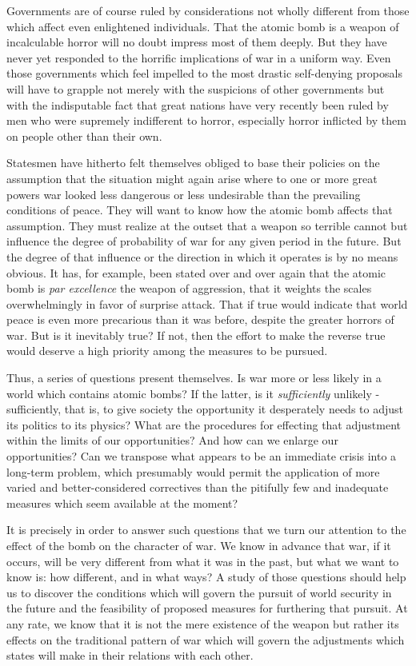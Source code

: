 Governments are of course ruled by considerations not wholly different from those which affect even enlightened individuals. That the atomic bomb is a weapon of incalculable horror will no doubt impress most of them deeply. But they have never yet responded to the horrific implications of war in a uniform way. Even those governments which feel impelled to the most drastic self-denying proposals will have to grapple not merely with the suspicions of other governments but with the indisputable fact that great nations have very recently been ruled by men who were supremely indifferent to horror, especially horror inflicted by them on people other than their own.

Statesmen have hitherto felt themselves obliged to base their policies on the assumption that the situation might again arise where to one or more great powers war looked less dangerous or less undesirable than the prevailing conditions of peace. They will want to know how the atomic bomb affects that assumption. They must realize at the outset that a weapon so terrible cannot but influence the degree of probability of war for any given period in the future. But the degree of that influence or the direction in which it operates is by no means obvious. It has, for example, been stated over and over again that the atomic bomb is \emph{par excellence} the weapon of aggression, that it weights the scales overwhelmingly in favor of surprise attack. That if true would indicate that world peace is even more precarious than it was before, despite the greater horrors of war. But is it inevitably true? If not, then the effort to make the reverse true would deserve a high priority among the measures to be pursued.

Thus, a series of questions present themselves. Is war more or less likely in a world which contains atomic bombs? If the latter, is it \emph{sufficiently} unlikely - sufficiently, that is, to give society the opportunity it desperately needs to adjust its politics to its physics? What are the procedures for effecting that adjustment within the limits of our opportunities? And how can we enlarge our opportunities? Can we transpose what appears to be an immediate crisis into a long-term problem, which presumably would permit the application of more varied and better-considered correctives than the pitifully few and inadequate measures which seem available at the moment?

It is precisely in order to answer such questions that we turn our attention to the effect of the bomb on the character of war. We know in advance that war, if it occurs, will be very different from what it was in the past, but what we want to know is: how different, and in what ways? A study of those questions should help us to discover the conditions which will govern the pursuit of world security in the future and the feasibility of proposed measures for furthering that pursuit. At any rate, we know that it is not the mere existence of the weapon but rather its effects on the traditional pattern of war which will govern the adjustments which states will make in their relations with each other.

